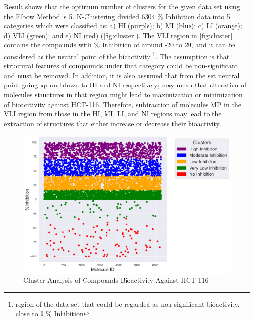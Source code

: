 Result shows that the optimum number of clusters for the given data set using the Elbow Method is 5. K-Clustering divided 6304 \% Inhibition data into 5 categories which were classified as: a) HI (purple); b) MI (blue); c) LI (orange); d) VLI (green); and e) NI (red) (\autoref{fig:cluster}). The VLI region in \autoref{fig:cluster} contains the compounds with \% Inhibition of around -20 to 20, and it can be considered as the neutral point of the bioactivity \footnote{region of the data set that could be regarded as non significant bioactivity, close to 0 \% Inhibition}. The assumption is that structural features of compounds under that category could be non-significant and must be removed. In addition, it is also assumed that from the set neutral point going up and down to HI and NI respectively; may mean that alteration of molecules structures in that region might lead to maximization or minimization of bioacitivity against HCT-116. Therefore, subtraction of molecules MP in the VLI region from those  in the HI, MI, LI, and NI regions may lead to the extraction of structures that either increase or decrease their bioactivity.        



\begin{figure}[h] %
	\centering
	\includegraphics[scale=0.6]{cluster.png} %
	\caption{Cluster Analysis of Compounds Bioactivity Against HCT-116}
	\label{fig:cluster} %
\end{figure}

